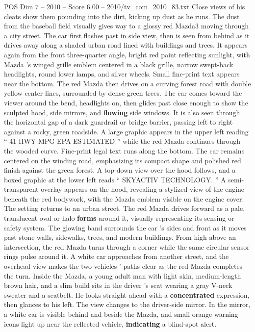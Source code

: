 \begin{textsample}{POS Dim 7 – 2010 – Score 6.00 – 2010/tv\_com\_2010\_83.txt}
Close views of his cleats show them pounding into the dirt, kicking up dust as he runs.
The dust from the baseball field visually gives way to a glossy red Mazda3 moving through a city street.
The car first flashes past in side view, then is seen from behind as it drives away along a shaded urban road lined with buildings and trees.
It appears again from the front three-quarter angle, bright red paint reflecting sunlight, with Mazda ’s winged grille emblem centered in a black grille, narrow swept-back headlights, round lower lamps, and silver wheels.
Small fine-print text appears near the bottom.
The red Mazda then drives on a curving forest road with double yellow center lines, surrounded by dense green trees.
The car comes toward the viewer around the bend, headlights on, then glides past close enough to show the sculpted hood, side mirrors, and \textbf{flowing} side windows.
It is also seen through the horizontal gap of a dark guardrail or bridge barrier, passing left to right against a rocky, green roadside.
A large graphic appears in the upper left reading “ 41 HWY MPG EPA-ESTIMATED ” while the red Mazda continues through the wooded curve.
Fine-print legal text runs along the bottom.
The car remains centered on the winding road, emphasizing its compact shape and polished red finish against the green forest.
A top-down view over the hood follows, and a boxed graphic at the lower left reads “ SKYACTIV TECHNOLOGY. ” A semi-transparent overlay appears on the hood, revealing a stylized view of the engine beneath the red bodywork, with the Mazda emblem visible on the engine cover.
The setting returns to an urban street.
The red Mazda drives forward as a pale, translucent oval or halo \textbf{forms} around it, visually representing its sensing or safety system.
The glowing band surrounds the car ’s sides and front as it moves past stone walls, sidewalks, trees, and modern buildings.
From high above an intersection, the red Mazda turns through a corner while the same circular sensor rings pulse around it.
A white car approaches from another street, and the overhead view makes the two vehicles ’ paths clear as the red Mazda completes the turn.
Inside the Mazda, a young adult man with light skin, medium-length brown hair, and a slim build sits in the driver ’s seat wearing a gray V-neck sweater and a seatbelt.
He looks straight ahead with a \textbf{concentrated} expression, then glances to his left.
The view changes to the driver-side mirror.
In the mirror, a white car is visible behind and beside the Mazda, and small orange warning icons light up near the reflected vehicle, \textbf{indicating} a blind-spot alert.

\end{textsample}
